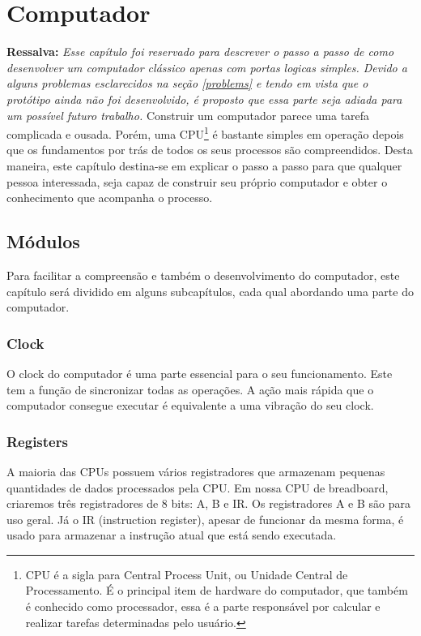 \section{Computador} 
\textbf{Ressalva: }
\textit{Esse capítulo foi reservado para descrever o passo a passo de como desenvolver um computador clássico apenas com portas logicas simples. Devido a alguns problemas esclarecidos na seção \ref{problems} e tendo em vista que o protótipo ainda não foi desenvolvido, é proposto que essa parte seja adiada para um possível futuro trabalho.}
\newline
\newline
Construir um computador parece uma tarefa complicada e ousada. Porém, uma CPU\footnote{CPU é a sigla para Central Process Unit, ou Unidade Central de Processamento. É o principal item de hardware do computador, que também é conhecido como processador, essa é a parte responsável por calcular e realizar tarefas determinadas pelo usuário.} é bastante simples em operação depois que os fundamentos por trás de todos os seus processos são compreendidos. Desta maneira, este capítulo destina-se em explicar o passo a passo para que qualquer pessoa interessada, seja capaz de construir seu próprio computador e obter o conhecimento que acompanha o processo.

\subsection{Módulos}
Para facilitar a compreensão e também o desenvolvimento do computador, este capítulo será dividido em alguns subcapítulos, cada qual abordando uma parte do computador.

\subsubsection{Clock}
O clock do computador é uma parte essencial para o seu funcionamento. Este tem a função de sincronizar todas as operações. A ação mais rápida que o computador consegue executar é equivalente a uma vibração do seu clock.

\subsubsection{Registers}
A maioria das CPUs possuem vários registradores que armazenam pequenas quantidades de dados processados pela CPU. Em nossa CPU de breadboard, criaremos três registradores de 8 bits: A, B e IR. Os registradores A e B são para uso geral. Já o IR (instruction register), apesar de funcionar da mesma forma, é usado para armazenar a instrução atual que está sendo executada.

